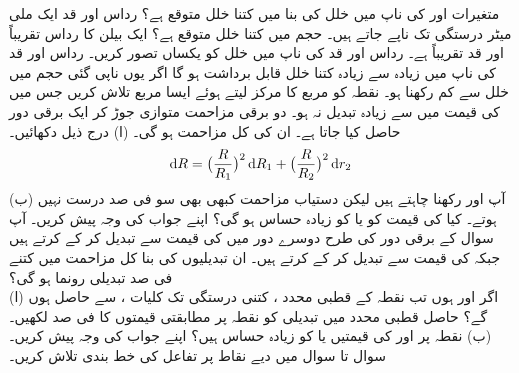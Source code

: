 متغیرات  اور  کی ناپ میں  خلل کی بنا   میں کتنا خلل متوقع ہے؟
رداس  اور قد  ایک ملی میٹر درستگی تک ناپے جاتے ہیں۔ حجم  میں کتنا خلل متوقع ہے؟ 
ایک بیلن کا رداس  تقریباً  اور قد تقریباً   ہے۔  رداس اور قد کی ناپ میں خلل کو یکساں تصور کریں۔ رداس اور قد کی ناپ میں زیادہ سے زیادہ کتنا خلل  قابل برداشت ہو گا اگر یوں ناپی گئی حجم میں خلل  سے کم رکھنا ہو۔ 
نقطہ  کو  مربع  کا مرکز لیتے ہوئے ایسا مربع تلاش کریں جس میں   کی قیمت میں   سے زیادہ تبدیل نہ ہو۔
دو برقی مزاحمت متوازی جوڑ کر ایک برقی دور حاصل کیا  جاتا  ہے۔ ان کی کل مزاحمت  ہو گی۔ (ا) درج ذیل دکھائیں۔
\begin{align*}
\dif R=\big(\frac{R}{R_1}\big)^2\dif R_1+\big(\frac{R}{R_2}\big)^2\dif r_2
\end{align*}
(ب) آپ   اور  رکھنا چاہتے ہیں لیکن   دستیاب مزاحمت کبھی بھی سو فی صد درست  نہیں ہوتے۔ کیا  کی قیمت  کو یا  کو زیادہ حساس ہو گی؟ اپنے جواب کی وجہ پیش کریں۔
آپ سوال  کے برقی دور کی طرح دوسرے دور  میں   کی قیمت   سے تبدیل کر کے  کرتے ہیں جبکہ  کی قیمت  سے تبدیل کر کے  کرتے ہیں۔ ان تبدیلیوں کی بنا کل مزاحمت  میں  کتنے فی صد تبدیلی رونما  ہو گی؟
\\
(ا) اگر  اور  ہوں تب  نقطہ  کے قطبی محدد ،  کتنی درستگی  تک   کلیات ،  سے   حاصل ہوں گے؟   حاصل قطبی محدد  میں تبدیلی کو  نقطہ  پر مطابقتی قیمتوں کا فی صد  لکھیں۔ (ب) نقطہ  پر  اور  کی قیمتیں  یا  کو زیادہ حساس ہیں؟ اپنے جواب کی وجہ پیش کریں۔ 
\\
سوال  تا سوال  میں دیے نقاط  پر تفاعل کی خط بندی  تلاش کریں۔ 


